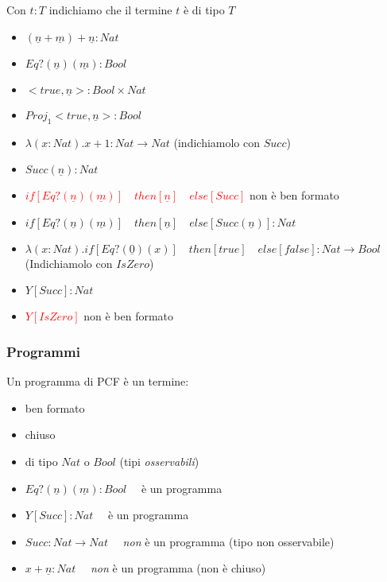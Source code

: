 \documentclass{beamer}
\begin{document}
\begin{frame}
	
	Con $t:T$ indichiamo che il termine $t$ è di tipo $T$
	
	\begin{example}
		\begin{itemize}
			\item $(\underline{n} + \underline{m})+ \underline{n} :Nat$
			\item $Eq?(\underline{n})(\underline{m}):Bool$
			\item $<true,\underline{n}>:Bool \times Nat$
			\item $Proj_1 <true,\underline{n}>:Bool$
			\item $\lambda (x:Nat) . x+1 : Nat\rightarrow Nat$ (indichiamolo con $Succ$)
			\item $Succ(\underline{n}):Nat$
			\item \textcolor{red}{$if[Eq?(\underline{n})(\underline{m})]\quad then [\underline{n}]
			\quad else[Succ]$} non è ben formato
			\item $if[Eq?(\underline{n})(\underline{m})]\quad then [\underline{n}]
			\quad else[ Succ(\underline{n}) ] :Nat$
			\item $\lambda(x:Nat).if[Eq?(\underline{0})(x)]\quad then [true]
			\quad else [false]: Nat \rightarrow Bool$ (Indichiamolo con $IsZero$)
			\item $Y [Succ]:Nat$
			\item \textcolor{red}{$Y[IsZero]$} non è ben formato
		\end{itemize}

	\end{example}

	
\end{frame}




\begin{frame}
	
	\frametitle{Programmi}
	
	Un programma di PCF è un termine:
	\begin{itemize}
		\item ben formato
		\item chiuso
		\item di tipo $Nat$ o $Bool$ (tipi \emph{osservabili})
	\end{itemize}

	
	\begin{example}
		\begin{itemize}
			\item $Eq?(\underline{n})(\underline{m}):Bool\quad$ è un programma
			\item $Y [Succ]:Nat\quad$ è un programma
			\item $Succ:Nat\rightarrow Nat\quad$ \emph{non} è un programma (tipo non osservabile)
			\item $x+\underline{n}:Nat\quad$ \emph{non} è un programma (non è chiuso)
		\end{itemize}

	\end{example}
	
\end{frame}
\end{document}
